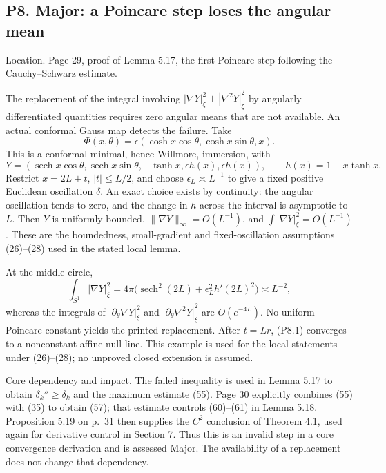 \documentclass[10pt]{article}
\begin{document}
\subsection*{P8. Major: a Poincare step loses the angular mean}
Location. Page 29, proof of Lemma 5.17, the first Poincare step following the Cauchy–Schwarz estimate.\par
The replacement of the integral involving \(|\nabla Y|_\xi^2+|\nabla^2Y|_\xi^2\) by angularly differentiated quantities requires zero angular means that are not available. An actual conformal Gauss map detects the failure. Take \[\Phi(x,\theta)=\epsilon
           (\cosh x\cos\theta,\cosh x\sin\theta,x).\] This is a conformal minimal, hence Willmore, immersion, with \[Y=\left(\operatorname{sech}x\cos\theta,
          \operatorname{sech}x\sin\theta,-\tanh x,
          \epsilon h(x),\epsilon h(x)\right),\qquad
 h(x)=1-x\tanh x .
 \tag{P8.1}\] Restrict \(x=2L+t\), \(|t|\le L/2\), and choose \(\epsilon_L\asymp L^{-1}\) to give a fixed positive Euclidean oscillation \(\delta\). An exact choice exists by continuity: the angular oscillation tends to zero, and the change in \(h\) across the interval is asymptotic to \(L\). Then \(Y\) is uniformly bounded, \(\|\nabla Y\|_\infty=O(L^{-1})\), and \(\int|\nabla Y|_\xi^2=O(L^{-1})\). These are the boundedness, small-gradient and fixed-oscillation assumptions (26)–(28) used in the stated local lemma.\par
At the middle circle, \[\int_{S^1}|\nabla Y|_\xi^2
 =4\pi\bigl(\operatorname{sech}^2(2L)
                +\epsilon_L^2h'(2L)^2\bigr)\asymp L^{-2},\] whereas the integrals of \(|\partial_\theta\nabla Y|_\xi^2\) and \(|\partial_\theta\nabla^2Y|_\xi^2\) are \(O(e^{-4L})\). No uniform Poincare constant yields the printed replacement. After \(t=Lr\), (P8.1) converges to a nonconstant affine null line. This example is used for the local statements under (26)–(28); no unproved closed extension is assumed.\par
Core dependency and impact. The failed inequality is used in Lemma 5.17 to obtain \(\delta_k''\ge\delta_k\) and the maximum estimate (55). Page 30 explicitly combines (55) with (35) to obtain (57); that estimate controls (60)–(61) in Lemma 5.18. Proposition 5.19 on p. 31 then supplies the \(C^2\) conclusion of Theorem 4.1, used again for derivative control in Section 7. Thus this is an invalid step in a core convergence derivation and is assessed Major. The availability of a replacement does not change that dependency.\par
\end{document}
